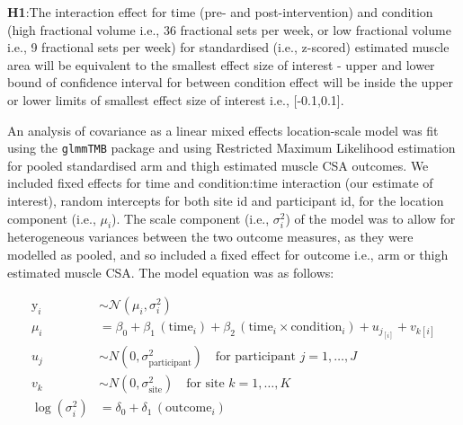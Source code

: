 \documentclass[
]{article}
\begin{document}
\textbf{H1}:The interaction effect for time (pre- and post-intervention)
and condition (high fractional volume i.e., 36 fractional sets per week,
or low fractional volume i.e., 9 fractional sets per week) for
standardised (i.e., z-scored) estimated muscle area will be equivalent
to the smallest effect size of interest - upper and lower bound of
confidence interval for between condition effect will be inside the
upper or lower limits of smallest effect size of interest i.e.,
{[}-0.1,0.1{]}.

An analysis of covariance as a linear mixed effects location-scale model
was fit using the \texttt{glmmTMB} package and using Restricted Maximum
Likelihood estimation for pooled standardised arm and thigh estimated
muscle CSA outcomes. We included fixed effects for time and
condition:time interaction (our estimate of interest), random intercepts
for both site id and participant id, for the location component (i.e.,
\(\mu_i\)). The scale component (i.e., \(\sigma_{i}^2\)) of the model
was to allow for heterogeneous variances between the two outcome
measures, as they were modelled as pooled, and so included a fixed
effect for outcome i.e., arm or thigh estimated muscle CSA. The model
equation was as follows:

\[
\begin{aligned}
\textrm{y}_{i} &\sim \mathcal{N}(\mu_i, \sigma_i^2) \\
\mu_i &= \beta_0
   + \beta_1 \, (\textrm{time}_i)
   + \beta_2 \, (\textrm{time}_i \times \textrm{condition}_i)
   + u_{j_[i]} + v_{k[i]} \\
u_j &\sim N(0, \sigma^2_{\text{participant}})
\quad \text{for participant } j = 1, \dots, J \\
v_k &\sim N(0, \sigma^2_{\text{site}})
\quad \text{for site } k = 1, \dots, K \\
\log(\sigma_i^2) &= \delta_0 + \delta_1 \, (\textrm{outcome}_i)
\end{aligned}
\]
\end{document}

